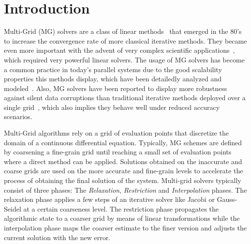 \section{Introduction}
\label{sec:intro}

Multi-Grid (MG) solvers are a class of linear methods~\cite{Hackbusch1991} that
emerged in the 80's to increase the convergence rate of more classical
iterative methods.  They became even more important with the advent of very
complex scientific applications~\cite{Ashby1996}, which required very powerful
linear solvers.  The usage of MG solvers has become a common practice in
today's parallel systems due to the good scalability properties this methods
display, which have been detailedly analyzed and modeled~\cite{Gahvari11}.
Also, MG solvers have been reported to display more robustness against silent
data corruptions than traditional iterative methods deployed over a single
grid~\cite{Casas12}, which also implies they behave well under reduced accuracy
scenarios.

Multi-Grid
algorithms rely on a grid of evaluation points that discretize the
domain of a continuous differential equation.  Typically, MG schemes are
defined by coarsening a fine-grain grid until reaching a small set of
evaluation points where a direct method can be applied.
Solutions obtained on the inaccurate and coarse grids are used on the more
accurate and fine-grain levels to accelerate the process of obtaining the final
solution of the system.
Multi-grid solvers typically consist of three phases: The \textit{Relaxation},
\textit{Restriction} and \textit{Interpolation} phases.  The relaxation phase
applies a few steps of an iterative solver like Jacobi or Gauss-Seidel at a
certain coarseness level.  The restriction phase propagates the algorithmic
state to a coarser grid by means of linear transformations while the
interpolation phase maps the coarser estimate to the finer version and adjusts
the current solution with the new error.

